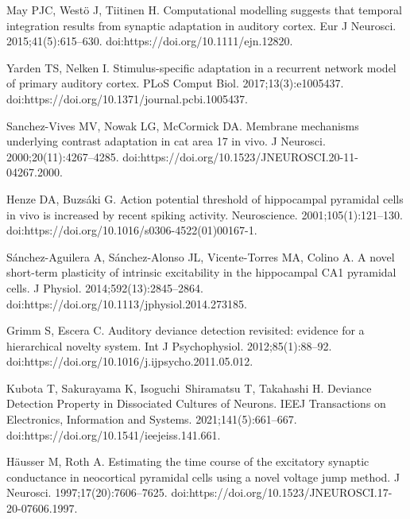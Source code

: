 \documentclass[10pt,letterpaper]{article}
\begin{document}
\begin{thebibliography}{100}
  May PJC, West{\"o} J, Tiitinen H.
  \newblock Computational modelling suggests that temporal integration results
    from synaptic adaptation in auditory cortex.
  \newblock Eur J Neurosci. 2015;41(5):615--630.
  \newblock doi:{https://doi.org/10.1111/ejn.12820}.
  
  Yarden TS, Nelken I.
  \newblock Stimulus-specific adaptation in a recurrent network model of primary
    auditory cortex.
  \newblock PLoS Comput Biol. 2017;13(3):e1005437.
  \newblock doi:{https://doi.org/10.1371/journal.pcbi.1005437}.
  
  Sanchez-Vives MV, Nowak LG, McCormick DA.
  \newblock Membrane mechanisms underlying contrast adaptation in cat area 17 in
    vivo.
  \newblock J Neurosci. 2000;20(11):4267--4285.
  \newblock doi:{https://doi.org/10.1523/JNEUROSCI.20-11-04267.2000}.
  
  Henze DA, Buzs{\'a}ki G.
  \newblock Action potential threshold of hippocampal pyramidal cells in vivo is
    increased by recent spiking activity.
  \newblock Neuroscience. 2001;105(1):121--130.
  \newblock doi:{https://doi.org/10.1016/s0306-4522(01)00167-1}.
  
  S{\'a}nchez-Aguilera A, S{\'a}nchez-Alonso JL, Vicente-Torres MA, Colino A.
  \newblock A novel short-term plasticity of intrinsic excitability in the
    hippocampal {CA1} pyramidal cells.
  \newblock J Physiol. 2014;592(13):2845--2864.
  \newblock doi:{https://doi.org/10.1113/jphysiol.2014.273185}.
  
  Grimm S, Escera C.
  \newblock Auditory deviance detection revisited: evidence for a hierarchical
    novelty system.
  \newblock Int J Psychophysiol. 2012;85(1):88--92.
  \newblock doi:{https://doi.org/10.1016/j.ijpsycho.2011.05.012}.
  
  Kubota T, Sakurayama K, Isoguchi~Shiramatsu T, Takahashi H.
  \newblock Deviance Detection Property in Dissociated Cultures of Neurons.
  \newblock IEEJ Transactions on Electronics, Information and Systems.
    2021;141(5):661--667.
  \newblock doi:{https://doi.org/10.1541/ieejeiss.141.661}.
  
  H{\"a}usser M, Roth A.
  \newblock Estimating the time course of the excitatory synaptic conductance in
    neocortical pyramidal cells using a novel voltage jump method.
  \newblock J Neurosci. 1997;17(20):7606--7625.
  \newblock doi:{https://doi.org/10.1523/JNEUROSCI.17-20-07606.1997}.
  

\end{thebibliography}
\end{document}
